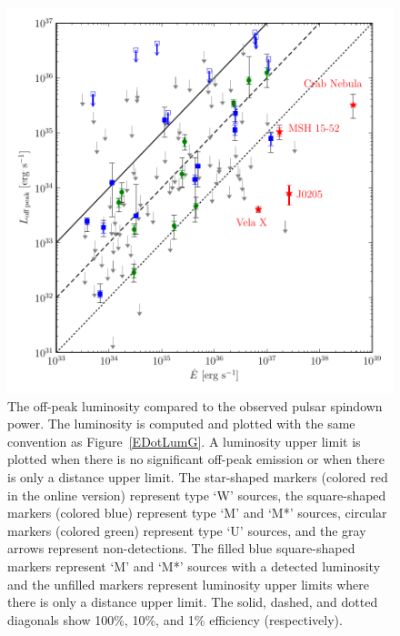 \begin{figure}
  \includegraphics{chapters/offpeak/figures/off_peak_luminosity_vs_edot_color.pdf}
  \caption{The off-peak luminosity compared to the observed pulsar spindown power. 
  The luminosity is computed and plotted with the same convention as
  Figure~\ref{EDotLumG}. A luminosity upper limit is plotted
  when there is no significant off-peak emission or when there
  is only a distance upper limit.
  The
  star-shaped markers (colored red in the online version) represent
  type `W' sources, the square-shaped markers (colored blue) represent type `M' 
  and `M*' sources, 
  circular markers (colored green) represent type `U' sources,
  and the gray arrows represent non-detections.
  The filled blue square-shaped markers represent `M' and `M*' sources
  with a detected luminosity and the unfilled markers represent luminosity
  upper limits where there is only a distance upper limit.
  The solid, dashed, and dotted diagonals show 100\%, 10\%, and 1\% efficiency
  (respectively).
  }
\end{figure}
